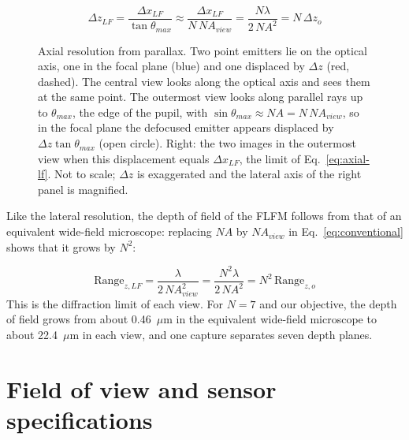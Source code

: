 \begin{equation}
    \Delta z_{LF} = \frac{\Delta x_{LF}}{\tan\theta_{max}}
    \approx \frac{\Delta x_{LF}}{N\,NA_{view}}
    = \frac{N\lambda}{2\,NA^2}
    = N\,\Delta z_o
    \label{eq:axial-lf}
\end{equation}

\begin{figure}[tbp]
    \centering
    \resizebox{\textwidth}{!}{}
    \caption{Axial resolution from parallax. Two point emitters lie on the optical axis, one in the focal plane (blue) and one displaced by $\Delta z$ (red, dashed). The central view looks along the optical axis and sees them at the same point. The outermost view looks along parallel rays up to $\theta_{max}$, the edge of the pupil, with $\sin\theta_{max}\approx NA=N\,NA_{view}$, so in the focal plane the defocused emitter appears displaced by $\Delta z\tan\theta_{max}$ (open circle). Right: the two images in the outermost view when this displacement equals $\Delta x_{LF}$, the limit of Eq.~\eqref{eq:axial-lf}. Not to scale; $\Delta z$ is exaggerated and the lateral axis of the right panel is magnified.}
    \label{fig:axial-parallax}
\end{figure}

Like the lateral resolution, the depth of field of the FLFM follows from that of an equivalent wide-field microscope: replacing $NA$ by $NA_{view}$ in Eq.~\eqref{eq:conventional} shows that it grows by $N^2$:

\begin{equation}
    \mathrm{Range}_{z,LF} = \frac{\lambda}{2\,NA_{view}^2} = \frac{N^2\lambda}{2\,NA^2} = N^2\,\mathrm{Range}_{z,o}
    \label{eq:dof-lf}
\end{equation}
This is the diffraction limit of each view. For $N=7$ and our objective, the depth of field grows from about 0.46~$\mu$m in the equivalent wide-field microscope to about 22.4~$\mu$m in each view, and one capture separates seven depth planes.

\section{Field of view and sensor specifications}
\label{sec:fov-sensor-spec}


